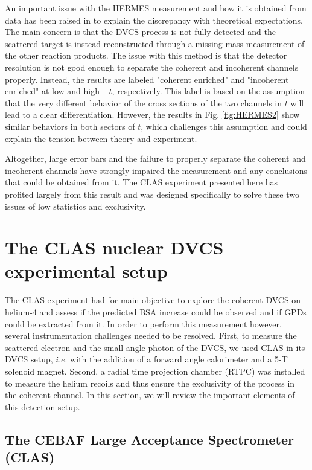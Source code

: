 \documentclass[aps,prc,preprint,superscriptaddress]{revtex4}
\begin{document}
An important issue with the HERMES measurement and how it is obtained from data has been raised in
\cite{Guzey:2003jh} to explain the discrepancy with theoretical expectations.
The main concern is that the DVCS process is not fully detected and the scattered target
is instead reconstructed through a missing mass measurement of the other reaction products. The 
issue with this method is that the detector resolution is not good enough to separate the 
coherent and incoherent channels properly. 
Instead, the results are labeled "coherent enriched" and "incoherent enriched" at low and high 
$-t$, respectively. This label is based on the assumption that the very different behavior of the
cross sections of the two channels in $t$ will lead to a clear differentiation. However, the
results in Fig. \ref{fig:HERMES2} show similar behaviors in both sectors of $t$, which  
challenges this assumption and could explain the tension between theory and experiment. 

Altogether, large error bars and the failure to properly separate the coherent and 
incoherent channels have strongly impaired the measurement and any conclusions that could be
obtained from it. The CLAS experiment presented here has profited largely from this
result and was designed specifically to solve these two issues of low statistics and exclusivity.

\section{The CLAS nuclear DVCS experimental setup}

The CLAS experiment had for main objective to explore the coherent DVCS on helium-4 and assess if
the predicted BSA increase could be observed and if GPDs could be extracted from it. In order to
perform this measurement however, several instrumentation challenges needed to be resolved. First, to
measure the scattered electron and the small angle photon of the DVCS, we used CLAS in its 
DVCS setup, $i.e.$ with the addition of a forward angle calorimeter and a 5-T solenoid magnet. Second, a
radial time projection chamber (RTPC) was installed to measure the
helium recoils and thus ensure the exclusivity of the process in the coherent channel. In this section, we 
will review the important elements of this detection setup. 

\subsection{The CEBAF Large Acceptance Spectrometer (CLAS)}
\end{document}
